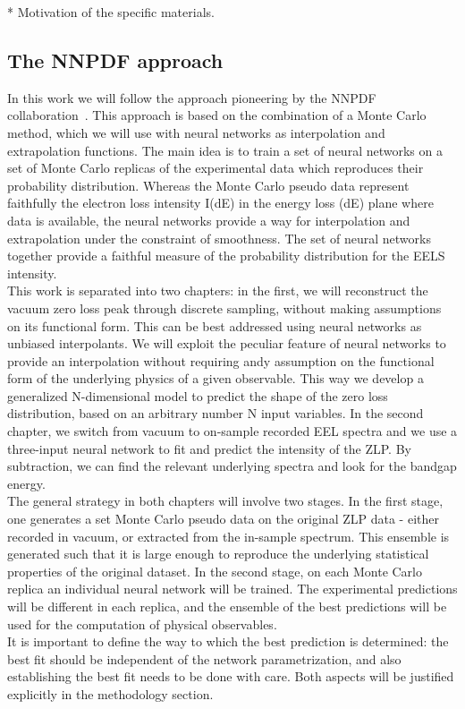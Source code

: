 \documentclass[11pt,a4paper]{article}
\numberwithin{equation}{section}
\numberwithin{figure}{section}
\numberwithin{table}{section}
\begin{document}
* Motivation of the specific materials.




\subsection{The NNPDF approach}
In this work we will follow the approach pioneering by the NNPDF collaboration~\cite{Ball:2017}. This approach is based on the combination of a Monte Carlo method, which we will use with neural networks as interpolation and extrapolation functions. The main idea is to train a set of neural networks on a set of Monte Carlo replicas of the experimental data which reproduces their probability distribution. Whereas the Monte Carlo pseudo data represent faithfully the electron loss intensity I(dE) in the energy loss (dE) plane where data is available, the neural networks provide a way for interpolation and extrapolation under the constraint of smoothness. The set of neural networks together provide a faithful measure of the probability distribution for the EELS intensity. \\

This work is separated into two chapters: in the first, we will reconstruct the vacuum zero loss peak through discrete sampling, without making assumptions on its functional form. This can be best addressed using neural networks as unbiased interpolants. We will exploit the peculiar feature of neural networks to provide an interpolation without requiring andy assumption on the functional form of the underlying physics of a given observable. This way we develop a generalized N-dimensional model to predict the shape of the zero loss distribution, based on an arbitrary number N input variables. 
In the second chapter, we switch from vacuum to on-sample recorded EEL spectra and we use a three-input neural network to fit and predict the intensity of the ZLP. By subtraction, we can find the relevant underlying spectra and look for the bandgap energy.\\
The general strategy in both chapters will involve two stages. In the first stage, one generates a set Monte Carlo pseudo data on the original ZLP data - either recorded in vacuum, or extracted from the in-sample spectrum. This ensemble is generated such that it is large enough to reproduce the underlying statistical properties of the original dataset. In the second stage, on each Monte Carlo replica an individual neural network will be trained. The experimental predictions will be different in each replica, and the ensemble of the best predictions will be used for the computation of physical observables.\\
It is important to define the way to which the best prediction is determined: the best fit should be independent of the network parametrization, and also establishing the best fit needs to be done with care. Both aspects will be justified explicitly in the methodology section. \\
\end{document}

